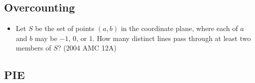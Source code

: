 \documentclass{article}
\begin{document}
\subsection{Overcounting}

\begin{itemize}
\item Let $S$ be the set of points $(a,b)$ in the coordinate plane, where each of $a$ and $b$ may be $-1$, $0$, or $1$. How many distinct lines pass through at least two members of $S$? (2004 AMC 12A)

\end{itemize}

\subsection{PIE}
\end{document}
